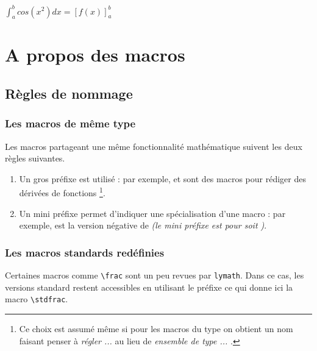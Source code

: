 \documentclass[12pt,a4paper]{article}
\begin{document}
\begin{latexex}
$ \displaystyle
  \int_a^b cos(x^2) dx
= \left[ f(x) \right]_a^b$
\end{latexex}




\section{A propos des macros}

\subsection{Règles de nommage}

\subsubsection{Les macros de même \og type \fg}

Les macros partageant une même fonctionnalité mathématique suivent les deux règles suivantes.
\begin{enumerate}
	\item Un gros préfixe est utilisé : 
	      par exemple,  et  sont des macros pour rédiger des dérivées de fonctions
	      \footnote{
	      	Ce choix est assumé même si pour les macros du type  on obtient un nom faisant penser à \emph{\og régler ... \fg} au lieu de \emph{\og ensemble de type ... \fg}.
		  }.

	\item Un mini préfixe permet d'indiquer une spécialisation d'une macro : 
	      par exemple,  est la version négative de  \emph{(le mini préfixe  est pour  soit )}.
\end{enumerate}




\subsubsection{Les macros standards redéfinies}

Certaines macros comme \verb+\frac+ sont un peu revues par \verb+lymath+.
Dans ce cas, les versions standard restent accessibles en utilisant le préfixe  ce qui donne ici la macro \verb+\stdfrac+.


\end{document}
